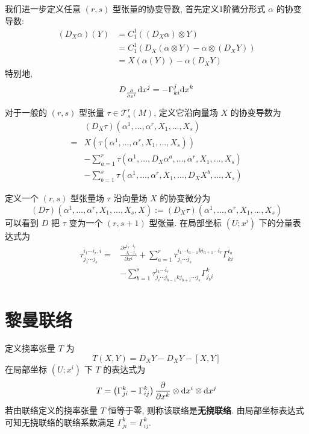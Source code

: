 \documentclass{book}
\newcommand{\md}{{\rm d}}
\newcommand{\pd}[2]{\frac{\partial #1}{\partial #2}}
\begin{document}
        我们进一步定义任意 $(r,s)$ 型张量的协变导数, 首先定义1阶微分形式 $\alpha$ 的协变导数:
        \begin{align*}
            \left(D_{X}\alpha\right)(Y) &= C^1_1\left((D_X\alpha)\otimes Y\right) \\
            &= C^1_1\left(D_X(\alpha\otimes Y)-\alpha\otimes(D_XY)\right) \\
            &= X(\alpha(Y))-\alpha(D_XY)
        \end{align*}
        特别地,
        \begin{equation*}
            D_{\pd{}{x^i}}{\md x^j} = -\Gamma_{ki}^j{\md x^k}
        \end{equation*}

        对于一般的 $(r,s)$ 型张量 $\tau\in\mathcal{T}^r_s(M)$, 定义它沿向量场 $X$ 的协变导数为
        \begin{align*}
            &(D_X\tau)(\alpha^1,\dots,\alpha^r,X_1,\dots,X_s) \\
            =& X\left(\tau(\alpha^1,\dots,\alpha^r,X_1,\dots,X_s)\right) \\
            &-\sum_{a=1}^{r}\tau\left(\alpha^1,\dots,D_X\alpha^a,\dots,\alpha^r,X_1,\dots,X_s\right) \\
            &-\sum_{b=1}^{s}\tau\left(\alpha^1,\dots,\alpha^r,X_1,\dots,D_X{X^b},\dots,X_s\right)
        \end{align*}

        定义一个 $(r,s)$ 型张量场 $\tau$ 沿向量场 $X$ 的协变微分为
        \begin{equation*}
            (D\tau)(\alpha^1,\dots,\alpha^r,X_1,\dots,X_s,X):=(D_X\tau)(\alpha^1,\dots,\alpha^r,X_1,\dots,X_s)
        \end{equation*}
        可以看到 $D$ 把 $\tau$ 变为一个 $(r,s+1)$ 型张量. 在局部坐标 $\left(U;x^i\right)$ 下的分量表达式为
        \begin{align*}
            \tau^{i_1\cdots i_r,i}_{j_1\cdots j_s} =& \pd{\tau^{i_1\cdots i_r}_{j_1\cdots j_s}}{x^i} + \sum_{a=1}^{r}\tau^{i_1\cdots i_{a-1}k i_{a+1}\cdots i_r}_{j_1\cdots j_s}\Gamma^{i_a}_{ki} \\
            & -\sum_{b=1}^{s}\tau^{i_1\cdots i_r}_{j_i\cdots j_{b-1}k j_{b+1}\cdots j_s}\Gamma^{k}_{j_b i}
        \end{align*}
    \section{黎曼联络}
        定义挠率张量 $T$ 为
        \begin{equation*}
            T(X,Y)=D_XY-D_XY-[X,Y]
        \end{equation*}
        在局部坐标 $\left(U;x^i\right)$ 下 $T$ 的表达式为
        \begin{equation*}
            T = \left(\Gamma^{k}_{ji}-\Gamma^{k}_{ij}\right)\pd{}{x^k}\otimes\md x^i\otimes\md x^j
        \end{equation*}
        若由联络定义的挠率张量 $T$ 恒等于零, 则称该联络是\textbf{无挠联络}. 由局部坐标表达式可知无挠联络的联络系数满足 $\Gamma^{k}_{ji}=\Gamma^{k}_{ij}$.
\end{document}
